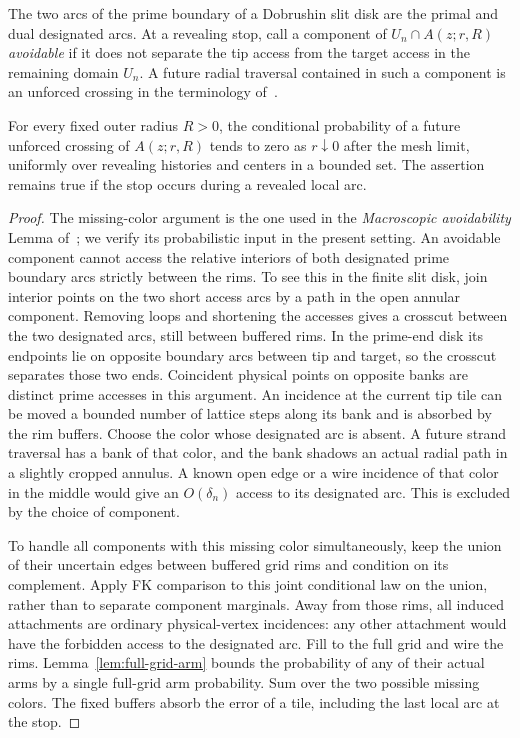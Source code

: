 The two arcs of the prime boundary of a Dobrushin slit disk are the
primal and dual designated arcs.  At a revealing stop, call a
component of $U_n\cap A(z;r,R)$ \emph{avoidable} if it does not
separate the tip access from the target access in the remaining
domain $U_n$.  A future radial traversal contained in such a
component is an unforced crossing in the terminology of~\cite{KS}.

\begin{lemma}
\label{lem:macroscopic-avoidability}
For every fixed outer radius $R>0$, the conditional probability of a
future unforced crossing of $A(z;r,R)$ tends to zero as $r\downarrow0$
after the mesh limit, uniformly over revealing histories and centers
in a bounded set.  The assertion remains true if the stop occurs
during a revealed local arc.
\end{lemma}

\begin{proof}
The missing-color argument is the one used in the \emph{Macroscopic
avoidability} Lemma of~\cite[Section ``Identification of the Dobrushin
strand'']{C}; we verify its probabilistic input in the present setting.
An avoidable component cannot access the relative interiors of both
designated prime boundary arcs strictly between the rims.  To see
this in the finite slit disk, join interior points on the two short
access arcs by a path in the open annular component.  Removing loops
and shortening the accesses gives a crosscut between the two
designated arcs, still between buffered rims.  In the prime-end disk
its endpoints lie on opposite boundary arcs between tip and target,
so the crosscut separates those two ends.  Coincident physical
points on opposite banks are distinct prime accesses in this
argument.  An incidence at the current tip tile can be moved a
bounded number of lattice steps along its bank and is absorbed by
the rim buffers.  Choose the color whose designated arc is
absent.  A future strand traversal has a bank of that color, and the
bank shadows an actual radial path in a slightly cropped annulus.
A known open edge or a wire incidence of that color in the middle
would give an $O(\delta_n)$ access to its designated arc.  This is
excluded by the choice of component.

To handle all components with this missing color simultaneously, keep
the union of their uncertain edges between buffered grid rims and
condition on its complement.  Apply FK comparison to this joint
conditional law on the union, rather than to separate component
marginals.  Away from those rims, all induced attachments are ordinary physical-vertex
incidences: any other attachment would have the forbidden access to
the designated arc.  Fill to the full grid and wire the rims.
Lemma~\ref{lem:full-grid-arm} bounds the probability of any of their
actual arms by a single full-grid arm probability.  Sum over the two
possible missing colors.  The fixed buffers absorb the error of a
tile, including the last local arc at the stop.
\end{proof}

